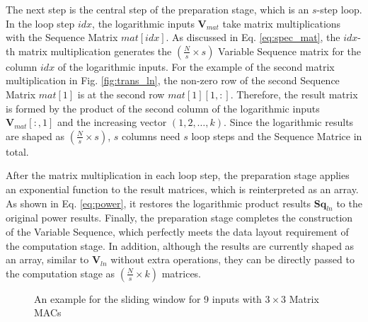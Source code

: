 The next step is the central step of the preparation stage, which is an $s$-step loop. In the loop step $idx$, the logarithmic inputs $\textbf{V}_{mat}$ take matrix multiplications with the Sequence Matrix $mat[idx]$. As discussed in Eq. \ref{eq:spec_mat}, the $idx$-th matrix multiplication generates the $(\frac{N}{s} \times s)$ Variable Sequence matrix for the column $idx$ of the logarithmic inputs. For the example of the second matrix multiplication in Fig. \ref{fig:trans_ln}, the non-zero row of the second Sequence Matrix $mat[1]$ is at the second row $mat[1][1, :]$. Therefore, the result matrix is formed by the product of the second column of the logarithmic inputs $\textbf{V}_{mat}[:, 1]$ and the increasing vector $(1, 2, \dots, k)$. Since the logarithmic results are shaped as $(\frac{N}{s} \times s)$, $s$ columns need $s$ loop steps and the Sequence Matrice in total.

After the matrix multiplication in each loop step, the preparation stage applies an exponential function to the result matrices, which is reinterpreted as an array. As shown in Eq. \ref{eq:power}, it restores the logarithmic product results $\textbf{Sq}_{ln}$ to the original power results. Finally, the preparation stage completes the construction of the Variable Sequence, which perfectly meets the data layout requirement of the computation stage. In addition, although the results are currently shaped as an array, similar to $\textbf{V}_{ln}$ without extra operations, they can be directly passed to the computation stage as $(\frac{N}{s} \times k)$ matrices.

\begin{figure}[t]
    \caption{An example for the sliding window for 9 inputs with $3 \times 3$ Matrix MACs}
    \label{fig:window}
    \end{figure}

